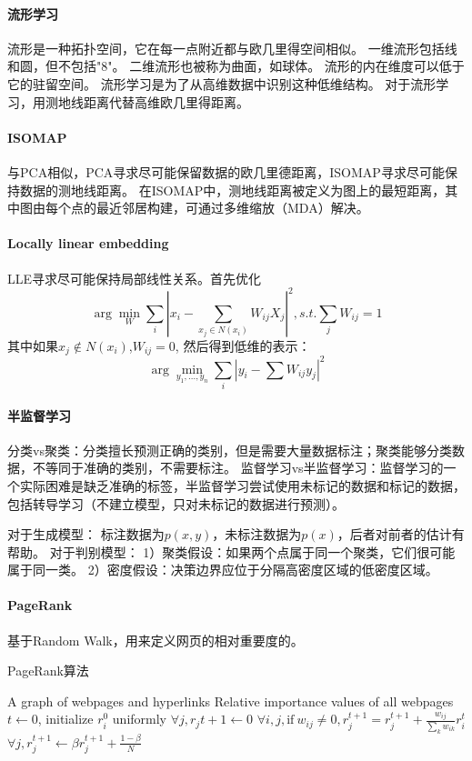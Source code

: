 \paragraph{流形学习}
流形是一种拓扑空间，它在每一点附近都与欧几里得空间相似。
一维流形包括线和圆，但不包括"8"。
二维流形也被称为曲面，如球体。
流形的内在维度可以低于它的驻留空间。
流形学习是为了从高维数据中识别这种低维结构。
对于流形学习，用测地线距离代替高维欧几里得距离。

\paragraph{ISOMAP} 
与PCA相似，PCA寻求尽可能保留数据的欧几里德距离，ISOMAP寻求尽可能保持数据的测地线距离。
在ISOMAP中，测地线距离被定义为图上的最短距离，其中图由每个点的最近邻居构建，可通过多维缩放（MDA）解决。

\paragraph{Locally linear embedding} 
LLE寻求尽可能保持局部线性关系。首先优化
\begin{equation}
\arg \min_W \sum_i |x_i-\sum_{x_j \in N(x_i)} W_{ij}X_j|^2, s.t. \sum_j W_{ij} = 1
\end{equation}
其中如果$x_j \notin N(x_i)$,$W_{ij}=0$, 然后得到低维的表示：
\begin{equation}
\arg \min_{y_1,...,y_n} \sum_i |y_i - \sum W_{ij}y_j|^2
\end{equation}

\paragraph{半监督学习} 分类vs聚类：分类擅长预测正确的类别，但是需要大量数据标注；聚类能够分类数据，不等同于准确的类别，不需要标注。
监督学习vs半监督学习：监督学习的一个实际困难是缺乏准确的标签，半监督学习尝试使用未标记的数据和标记的数据，包括转导学习（不建立模型，只对未标记的数据进行预测）。

对于生成模型：
标注数据为$p(x,y)$，未标注数据为$p(x)$，后者对前者的估计有帮助。
对于判别模型：
1）聚类假设：如果两个点属于同一个聚类，它们很可能属于同一类。
2）密度假设：决策边界应位于分隔高密度区域的低密度区域。

\paragraph{PageRank} 基于Random Walk，用来定义网页的相对重要度的。
\begin{algorithm}[H]
\caption{PageRank算法}
\label{alg:PageRank}
\begin{algorithmic}[1]
\Require A graph of webpages and hyperlinks
\Ensure Relative importance values of all webpages
\State $t \leftarrow 0$, initialize $r_i^0$ uniformly
\Repeat
\State $\forall j, r_j{t+1} \leftarrow 0$
\State $\forall i,j, \mathrm{if}\ w_{ij} \neq 0, r_j^{t+1} = r_j^{t+1} + \frac{w_{ij}}{\sum_k w_{ik}}r_i^t$
\State $\forall j, r_j^{t+1} \leftarrow \beta r_j^{t+1} + \frac{1-\beta}{N}$
\end{algorithmic}
\end{algorithm}

